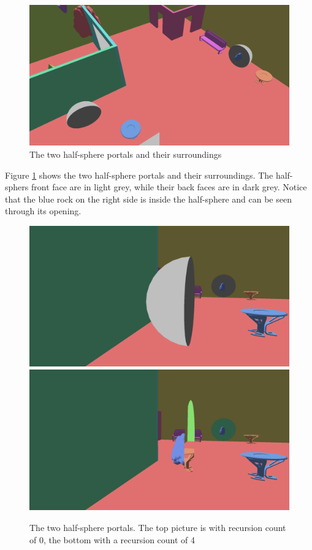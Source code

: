 \begin{figure}[H]
	\includegraphics[width=\linewidth]{images/nonplanarlayout.png}
	\caption{The two half-sphere portals and their surroundings}
	\label{fig:nonplanarlayout}
\end{figure}

Figure \ref{fig:nonplanarlayout} shows the two half-sphere portals and their surroundings. The half-sphers front face are in light grey, while their back faces are in dark grey. Notice that the blue rock on the right side is inside the half-sphere and can be seen through its opening.

\begin{figure}[H]
	\includegraphics[width=\linewidth]{images/NonPlanarR0.png}
	\includegraphics[width=\linewidth]{images/nonplanar.png}
	\caption{The two half-sphere portals. The top picture is with recursion count of 0, the bottom with a recursion count of 4}
	\label{fig:nonplanar}
\end{figure}

